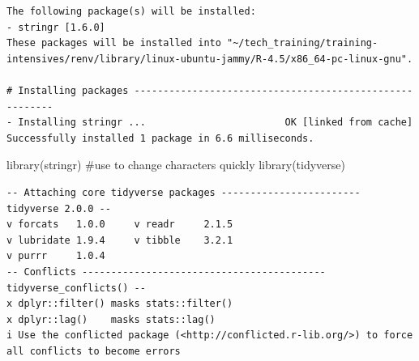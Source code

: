 \documentclass[
  letterpaper,
  DIV=11,
  numbers=noendperiod]{scrartcl}
\newenvironment{Shaded}{\begin{snugshade}}{\end{snugshade}}
\newcommand{\CommentTok}[1]{\textcolor[rgb]{0.37,0.37,0.37}{#1}}
\newcommand{\FunctionTok}[1]{\textcolor[rgb]{0.28,0.35,0.67}{#1}}
\newcommand{\NormalTok}[1]{\textcolor[rgb]{0.00,0.23,0.31}{#1}}
\begin{document}
\begin{verbatim}
The following package(s) will be installed:
- stringr [1.6.0]
These packages will be installed into "~/tech_training/training-intensives/renv/library/linux-ubuntu-jammy/R-4.5/x86_64-pc-linux-gnu".

# Installing packages --------------------------------------------------------
- Installing stringr ...                        OK [linked from cache]
Successfully installed 1 package in 6.6 milliseconds.
\end{verbatim}

\begin{Shaded}
\begin{Highlighting}[]
\FunctionTok{library}\NormalTok{(stringr) }\CommentTok{\#use to change characters quickly}
\FunctionTok{library}\NormalTok{(tidyverse)}
\end{Highlighting}
\end{Shaded}

\begin{verbatim}
-- Attaching core tidyverse packages ------------------------ tidyverse 2.0.0 --
v forcats   1.0.0     v readr     2.1.5
v lubridate 1.9.4     v tibble    3.2.1
v purrr     1.0.4     
-- Conflicts ------------------------------------------ tidyverse_conflicts() --
x dplyr::filter() masks stats::filter()
x dplyr::lag()    masks stats::lag()
i Use the conflicted package (<http://conflicted.r-lib.org/>) to force all conflicts to become errors
\end{verbatim}
\end{document}
